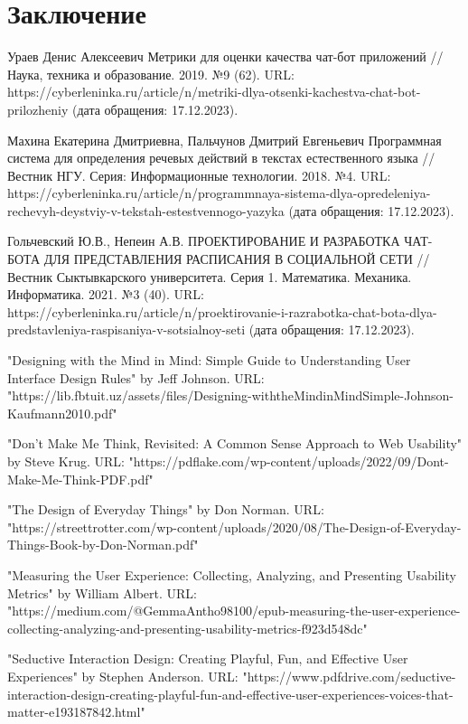 \documentclass{article}
\begin{document}
\section{Заключение}




   
Ураев Денис Алексеевич Метрики для оценки качества чат-бот приложений // Наука, техника и образование. 2019. №9 (62). URL: https://cyberleninka.ru/article/n/metriki-dlya-otsenki-kachestva-chat-bot-prilozheniy (дата обращения: 17.12.2023).

Махина Екатерина Дмитриевна, Пальчунов Дмитрий Евгеньевич Программная система для определения речевых действий в текстах естественного языка // Вестник НГУ. Серия: Информационные технологии. 2018. №4. URL: https://cyberleninka.ru/article/n/programmnaya-sistema-dlya-opredeleniya-rechevyh-deystviy-v-tekstah-estestvennogo-yazyka (дата обращения: 17.12.2023).

Гольчевский Ю.В., Непеин А.В. ПРОЕКТИРОВАНИЕ И РАЗРАБОТКА ЧАТ-БОТА ДЛЯ ПРЕДСТАВЛЕНИЯ РАСПИСАНИЯ В СОЦИАЛЬНОЙ СЕТИ // Вестник Сыктывкарского университета. Серия 1. Математика. Механика. Информатика. 2021. №3 (40). URL: https://cyberleninka.ru/article/n/proektirovanie-i-razrabotka-chat-bota-dlya-predstavleniya-raspisaniya-v-sotsialnoy-seti (дата обращения: 17.12.2023).

"Designing with the Mind in Mind: Simple Guide to Understanding User Interface Design Rules" by Jeff Johnson. URL: "https://lib.fbtuit.uz/assets/files/Designing-withtheMindinMindSimple-Johnson-Kaufmann2010.pdf"

"Don't Make Me Think, Revisited: A Common Sense Approach to Web Usability" by Steve Krug. URL:
"https://pdflake.com/wp-content/uploads/2022/09/Dont-Make-Me-Think-PDF.pdf"

"The Design of Everyday Things" by Don Norman. URL:
"https://streettrotter.com/wp-content/uploads/2020/08/The-Design-of-Everyday-Things-Book-by-Don-Norman.pdf"

"Measuring the User Experience: Collecting, Analyzing, and Presenting Usability Metrics" by William Albert. URL: "https://medium.com/@GemmaAntho98100/epub-measuring-the-user-experience-collecting-analyzing-and-presenting-usability-metrics-f923d548dc"

"Seductive Interaction Design: Creating Playful, Fun, and Effective User Experiences" by Stephen Anderson. URL: "https://www.pdfdrive.com/seductive-interaction-design-creating-playful-fun-and-effective-user-experiences-voices-that-matter-e193187842.html"
\end{document}
